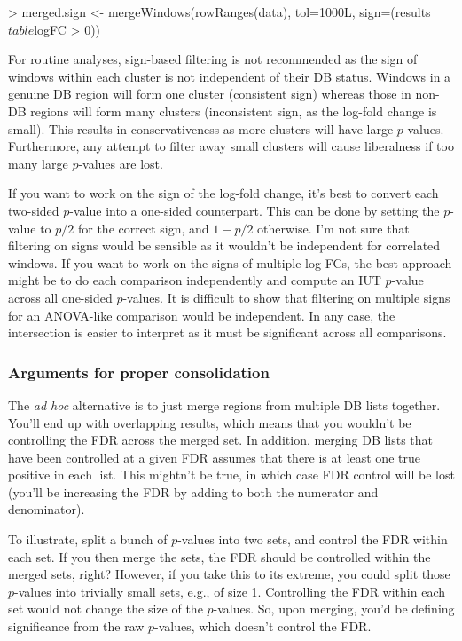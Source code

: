 \documentclass[12pt]{report}
\renewenvironment{Schunk}{\vspace{0pt}}{\vspace{0pt}}
\begin{document}
\begin{Schunk}
\begin{Sinput}
> merged.sign <- mergeWindows(rowRanges(data), tol=1000L, sign=(results$table$logFC > 0))
\end{Sinput}
\end{Schunk}

For routine analyses, sign-based filtering is not recommended as the sign of windows within each cluster is not independent of their DB status. 
Windows in a genuine DB region will form one cluster (consistent sign) whereas those in non-DB regions will form many clusters (inconsistent sign, as the log-fold change is small).
This results in conservativeness as more clusters will have large $p$-values.
Furthermore, any attempt to filter away small clusters will cause liberalness if too many large $p$-values are lost.

If you want to work on the sign of the log-fold change, it's best to convert each two-sided $p$-value into a one-sided counterpart.
This can be done by setting the $p$-value to $p/2$ for the correct sign, and $1-p/2$ otherwise.
I'm not sure that filtering on signs would be sensible as it wouldn't be independent for correlated windows.
If you want to work on the signs of multiple log-FCs, the best approach might be to do each comparison independently and compute an IUT $p$-value across all one-sided $p$-values.
It is difficult to show that filtering on multiple signs for an ANOVA-like comparison would be independent.
In any case, the intersection is easier to interpret as it must be significant across all comparisons.

\subsubsection*{Arguments for proper consolidation}

The \textit{ad hoc} alternative is to just merge regions from multiple DB lists together.  
You'll end up with overlapping results, which means that you wouldn't be controlling the FDR across the merged set. 
In addition, merging DB lists that have been controlled at a given FDR assumes that there is at least one true positive in each list. 
This mightn't be true, in which case FDR control will be lost (you'll be increasing the FDR by adding to both the numerator and denominator).

To illustrate, split a bunch of $p$-values into two sets, and control the FDR within each set.
If you then merge the sets, the FDR should be controlled within the merged sets, right?
However, if you take this to its extreme, you could split those $p$-values into trivially small sets, e.g., of size 1.
Controlling the FDR within each set would not change the size of the $p$-values.
So, upon merging, you'd be defining significance from the raw $p$-values, which doesn't control the FDR.
\end{document}
